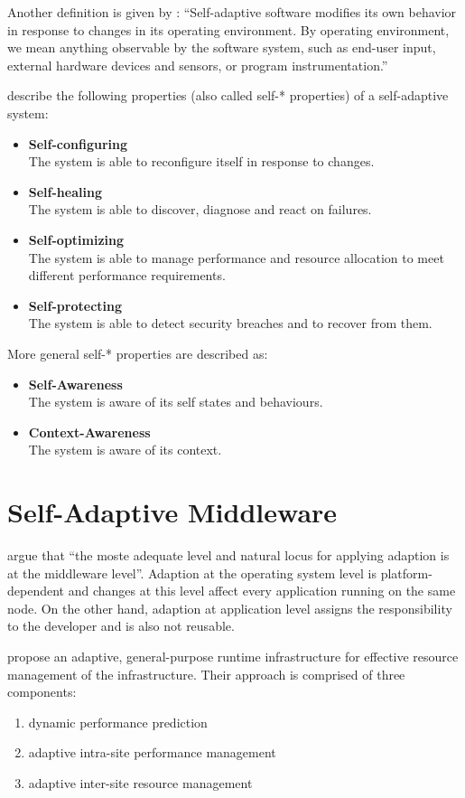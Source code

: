 Another definition is given by \citet{Oreizy:1999lh}: ``Self-adaptive software modifies its own behavior in response to changes in its operating environment. By operating environment, we mean anything observable by the software system, such as end-user input, external hardware devices and sensors, or program instrumentation.''

\cite{Salehie:2009pi} describe the following properties (also called self-* properties) of a self-adaptive system:
\begin{itemize}
	\item \textbf{Self-configuring}\\
	The system is able to reconfigure itself in response to changes.
	\item \textbf{Self-healing}\\
	The system is able to discover, diagnose and react on failures.
	\item \textbf{Self-optimizing}\\
	The system is able to manage performance and resource allocation to meet different performance requirements.
	\item \textbf{Self-protecting}\\
	The system is able to detect security breaches and to recover from them.
\end{itemize}

More general self-* properties are described as:
\begin{itemize}
	\item \textbf{Self-Awareness}\\
	The system is aware of its self states and behaviours.
	\item \textbf{Context-Awareness}\\
	The system is aware of its context.
\end{itemize}

\section{Self-Adaptive Middleware}

\citet{Duran-Limon:2004mi} argue that ``the moste adequate level and natural locus for applying adaption is at the middleware level''. Adaption at the operating system level is platform-dependent and changes at this level affect every application running on the same node. On the other hand, adaption at application level assigns the responsibility to the developer and is also not reusable.

\citet{Lee:2009vn} propose an adaptive, general-purpose runtime infrastructure for effective resource management of the infrastructure. Their approach is comprised of three components:
\begin{enumerate}
	\item dynamic performance prediction
	\item adaptive intra-site performance management
	\item adaptive inter-site resource management
\end{enumerate}


